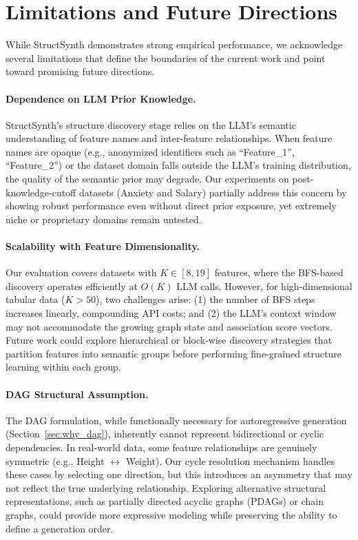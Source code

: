 \section{Limitations and Future Directions}

While StructSynth demonstrates strong empirical performance, we acknowledge several limitations that define the boundaries of the current work and point toward promising future directions.

\paragraph{Dependence on LLM Prior Knowledge.}
StructSynth's structure discovery stage relies on the LLM's semantic understanding of feature names and inter-feature relationships. When feature names are opaque (e.g., anonymized identifiers such as ``Feature\_1'', ``Feature\_2'') or the dataset domain falls outside the LLM's training distribution, the quality of the semantic prior may degrade. Our experiments on post-knowledge-cutoff datasets (Anxiety and Salary) partially address this concern by showing robust performance even without direct prior exposure, yet extremely niche or proprietary domains remain untested.

\paragraph{Scalability with Feature Dimensionality.}
Our evaluation covers datasets with $K \in [8, 19]$ features, where the BFS-based discovery operates efficiently at $O(K)$ LLM calls. However, for high-dimensional tabular data ($K > 50$), two challenges arise: (1) the number of BFS steps increases linearly, compounding API costs; and (2) the LLM's context window may not accommodate the growing graph state and association score vectors. Future work could explore hierarchical or block-wise discovery strategies that partition features into semantic groups before performing fine-grained structure learning within each group.

\paragraph{DAG Structural Assumption.}
The DAG formulation, while functionally necessary for autoregressive generation (Section~\ref{sec:why_dag}), inherently cannot represent bidirectional or cyclic dependencies. In real-world data, some feature relationships are genuinely symmetric (e.g., Height $\leftrightarrow$ Weight). Our cycle resolution mechanism handles these cases by selecting one direction, but this introduces an asymmetry that may not reflect the true underlying relationship. Exploring alternative structural representations, such as partially directed acyclic graphs (PDAGs) or chain graphs, could provide more expressive modeling while preserving the ability to define a generation order.

